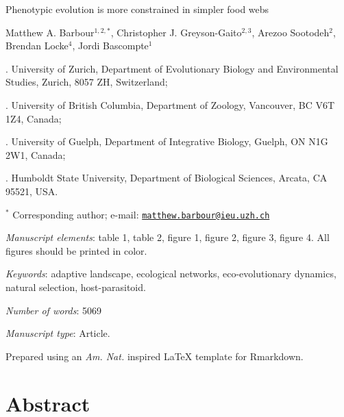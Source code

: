 \documentclass[11pt,]{article}
\title{}
\author{}
\date{}
\begin{document}
\vspace*{0.1cm}

\begin{center} \LARGE Phenotypic evolution is more constrained in simpler food webs \end{center}

\bigskip

\begin{center} \large Matthew A. Barbour$^{1,2,\ast}$, Christopher J. Greyson-Gaito$^{2,3}$, Arezoo Sootodeh$^{2}$, Brendan Locke$^{4}$, Jordi Bascompte$^{1}$ \normalsize \end{center}

\bigskip

. University of Zurich, Department of Evolutionary Biology
and Environmental Studies, Zurich, 8057 ZH, Switzerland;

. University of British Columbia, Department of Zoology,
Vancouver, BC V6T 1Z4, Canada;

. University of Guelph, Department of Integrative Biology,
Guelph, ON N1G 2W1, Canada;

. Humboldt State University, Department of Biological
Sciences, Arcata, CA 95521, USA.

\(^\ast\) Corresponding author; e-mail:
\href{mailto:matthew.barbour@ieu.uzh.ch}{\nolinkurl{matthew.barbour@ieu.uzh.ch}}

\bigskip

\emph{Manuscript elements}: table 1, table 2, figure 1, figure 2, figure
3, figure 4. All figures should be printed in color.

\bigskip

\emph{Keywords}: adaptive landscape, ecological networks,
eco-evolutionary dynamics, natural selection, host-parasitoid.

\bigskip

\emph{Number of words}: 5069

\bigskip

\emph{Manuscript type}: Article.

\bigskip

\footnotesize Prepared using an \emph{Am. Nat.} inspired \LaTeX{}
template for Rmarkdown. \normalsize

\linenumbers{} \modulolinenumbers[3]

\newpage

\section{Abstract}\label{abstract}
\end{document}
